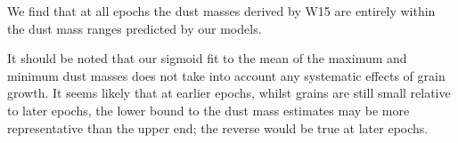 \documentclass[useAMS,usenatbib,usegraphicx]{mnras}
\begin{document}
We find that at all epochs  the dust masses derived by W15 are entirely within the dust mass ranges predicted by our models.

It should be noted that our sigmoid fit  to the mean of the maximum and minimum dust masses does not take into account any systematic effects of grain growth.  It seems likely that at earlier epochs, whilst grains are still small relative to later epochs, the lower bound to the dust mass estimates may be more representative than the upper end; the reverse would be true at later epochs.

%
%
\end{document}
